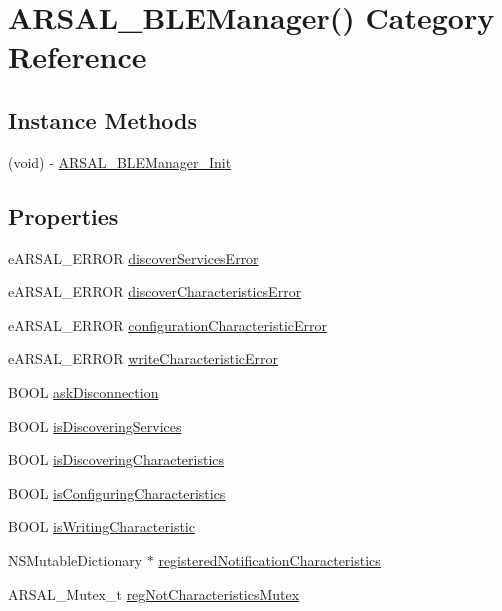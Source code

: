 \hypertarget{categoryARSAL__BLEManager_07_08}{}\section{A\+R\+S\+A\+L\+\_\+\+B\+L\+E\+Manager() Category Reference}
\label{categoryARSAL__BLEManager_07_08}
\subsection*{Instance Methods}
\begin{DoxyCompactItemize}
\item 
(void) -\/ \hyperlink{categoryARSAL__BLEManager_07_08_a114ff594e83a767cd582b77cdc25d7f0}{A\+R\+S\+A\+L\+\_\+\+B\+L\+E\+Manager\+\_\+\+Init}
\end{DoxyCompactItemize}
\subsection*{Properties}
\begin{DoxyCompactItemize}
\item 
e\+A\+R\+S\+A\+L\+\_\+\+E\+R\+R\+OR \hyperlink{categoryARSAL__BLEManager_07_08_afb7dca42e2a5996dcfc6d0eeea84ce14}{discover\+Services\+Error}
\item 
e\+A\+R\+S\+A\+L\+\_\+\+E\+R\+R\+OR \hyperlink{categoryARSAL__BLEManager_07_08_afaa6de70a23b7a5dd26a7c788c0ec135}{discover\+Characteristics\+Error}
\item 
e\+A\+R\+S\+A\+L\+\_\+\+E\+R\+R\+OR \hyperlink{categoryARSAL__BLEManager_07_08_ad4bfa8fea63cbffff5711e503f902a21}{configuration\+Characteristic\+Error}
\item 
e\+A\+R\+S\+A\+L\+\_\+\+E\+R\+R\+OR \hyperlink{categoryARSAL__BLEManager_07_08_a2a57520b14dc0500d5f77b4d056c6d43}{write\+Characteristic\+Error}
\item 
B\+O\+OL \hyperlink{categoryARSAL__BLEManager_07_08_a9545df8b76da87a8a4032d7b3b4d424d}{ask\+Disconnection}
\item 
B\+O\+OL \hyperlink{categoryARSAL__BLEManager_07_08_a8b0c53009ab15317c3cf9e1e178f14b0}{is\+Discovering\+Services}
\item 
B\+O\+OL \hyperlink{categoryARSAL__BLEManager_07_08_ab159618d9d76b98cfaa53cf66820cefb}{is\+Discovering\+Characteristics}
\item 
B\+O\+OL \hyperlink{categoryARSAL__BLEManager_07_08_a3124cd1734adfa93b1226c8ac222423f}{is\+Configuring\+Characteristics}
\item 
B\+O\+OL \hyperlink{categoryARSAL__BLEManager_07_08_a8268a431f84c1cf80683dcd49d5e69e7}{is\+Writing\+Characteristic}
\item 
N\+S\+Mutable\+Dictionary $\ast$ \hyperlink{categoryARSAL__BLEManager_07_08_a7325b966cd388be3e1af8da9a5dcf877}{registered\+Notification\+Characteristics}
\item 
A\+R\+S\+A\+L\+\_\+\+Mutex\+\_\+t \hyperlink{categoryARSAL__BLEManager_07_08_aaef95045d3088929af2f3efb3c5907ff}{reg\+Not\+Characteristics\+Mutex}
\end{DoxyCompactItemize}


